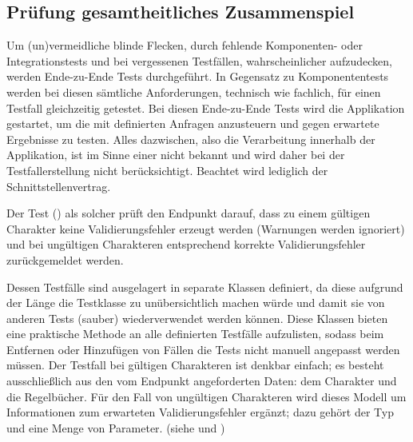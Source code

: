\subsection{Prüfung gesamtheitliches Zusammenspiel}\label{subsec:prufung-gesamntheitliches-zusammenspiel}

Um (un)vermeidliche blinde Flecken, durch fehlende Komponenten- oder Integrationstests und \insb bei vergessenen Testfällen, wahrscheinlicher aufzudecken, werden Ende-zu-Ende Tests durchgeführt.
In Gegensatz zu Komponententests werden bei diesen sämtliche Anforderungen, technisch wie fachlich, für einen Testfall gleichzeitig getestet.
Bei diesen Ende-zu-Ende Tests wird die Applikation gestartet, um die  mit definierten Anfragen anzusteuern und gegen erwartete Ergebnisse zu testen.
Alles dazwischen, also die Verarbeitung innerhalb der Applikation, ist im Sinne einer  nicht bekannt und wird daher bei der Testfallerstellung nicht berücksichtigt.
Beachtet wird lediglich der Schnittstellenvertrag.

Der Test  () als solcher \zB prüft den  Endpunkt darauf, dass zu einem gültigen Charakter keine Validierungsfehler erzeugt werden (Warnungen werden ignoriert) und bei ungültigen Charakteren entsprechend korrekte Validierungsfehler zurückgemeldet werden.

Dessen Testfälle sind ausgelagert in separate Klassen definiert, da diese aufgrund der Länge die Testklasse zu unübersichtlich machen würde und damit sie von anderen Tests (sauber) wiederverwendet werden können.
Diese Klassen bieten eine praktische Methode an alle definierten Testfälle aufzulisten, sodass beim Entfernen oder Hinzufügen von Fällen die Tests nicht manuell angepasst werden müssen.
Der Testfall bei gültigen Charakteren ist denkbar einfach; es besteht ausschließlich aus den vom Endpunkt angeforderten Daten: dem Charakter und die Regelbücher.
Für den Fall von ungültigen Charakteren wird dieses Modell um Informationen zum erwarteten Validierungsfehler ergänzt; dazu gehört der Typ und eine Menge von Parameter. (siehe  und )
